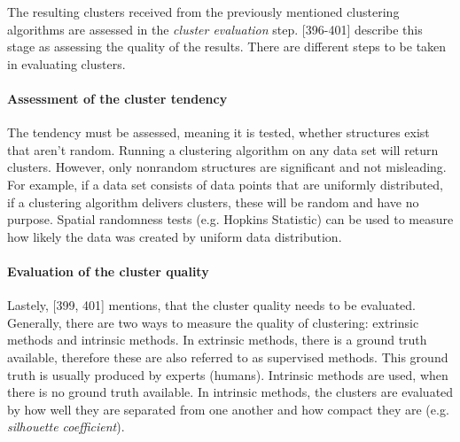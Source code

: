 The resulting clusters received from the previously mentioned clustering algorithms are assessed in the \textit{cluster evaluation} step. \textcite{han2011data}[396-401] describe this stage as assessing the quality of the results.
There are different steps to be taken in evaluating clusters. 
 
  \paragraph{Assessment of the cluster tendency}
  The tendency must be assessed, meaning it is tested, whether structures exist that aren't random. Running a clustering algorithm on any data set will return clusters. However, only nonrandom structures are significant and not misleading. For example, if a data set consists of data points that are uniformly distributed, if a clustering algorithm delivers clusters, these will be random and have no purpose. Spatial randomness tests (e.g. Hopkins Statistic) can be used to measure how likely the data was created by uniform data distribution.

 

  \paragraph{Evaluation of the cluster quality}
  Lastely, \textcite{han2011data}[399, 401] mentions, that the cluster quality needs to be evaluated. Generally, there are two ways to measure the quality of clustering: extrinsic methods and intrinsic methods. In extrinsic methods, there is a ground truth available, therefore these are also referred to as supervised methods. This ground truth is usually produced by experts (humans). Intrinsic methods are used, when there is no ground truth available. In intrinsic methods, the clusters are evaluated by how well they are separated from one another and how compact they are (e.g. \textit{silhouette coefficient}).

